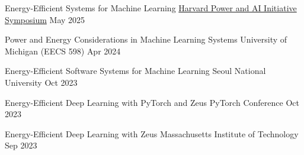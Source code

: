 

\begin{cvtalks}

  \cvtalk
    {Energy-Efficient Systems for Machine Learning} %
    {\href{https://pai.seas.harvard.edu/Events.html}{Harvard Power and AI Initiative Symposium}} %
    {May 2025} %

  \cvtalk
    {Power and Energy Considerations in Machine Learning Systems} %
    {University of Michigan (EECS 598)} %
    {Apr 2024} %

  \cvtalk
    {Energy-Efficient Software Systems for Machine Learning} %
    {Seoul National University} %
    {Oct 2023} %

  \cvtalk
    {Energy-Efficient Deep Learning with PyTorch and Zeus} %
    {PyTorch Conference} %
    {Oct 2023} %

  \cvtalk
    {Energy-Efficient Deep Learning with Zeus} %
    {Massachusetts Institute of Technology} %
    {Sep 2023} %

\end{cvtalks}
